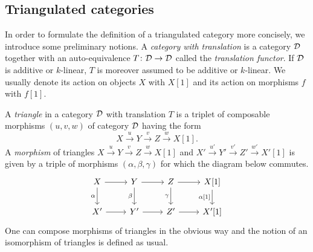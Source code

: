 \subsection{Triangulated categories}

In order to formulate the definition of a triangulated category more concisely, we introduce some preliminary notions. A \emph{category with translation} is a category $\mathcal D$ together with an auto-equivalence $T\colon \mathcal D \to \mathcal D$ called the \emph{translation functor}. If $\mathcal D$ is additive or $k$-linear, $T$ is moreover assumed to be additive or $k$-linear. We usually denote its action on objects $X$ with $X[1]$ and its action on morphisms $f$ with $f[1]$.

A \emph{triangle} in a category $\mathcal D$ with translation $T$ is a triplet of composable morphisms $(u, v, w)$ of category $\mathcal D$ having the form 
\[
    X\xrightarrow{u} Y \xrightarrow{v} Z \xrightarrow{w} X[1].
\]
A \emph{morphism} of triangles $X\xrightarrow{u} Y \xrightarrow{v} Z \xrightarrow{w} X[1]$ and $X'\xrightarrow{u'} Y' \xrightarrow{v'} Z' \xrightarrow{w'} X'[1]$ is given by a triple of morphisms $(\alpha, \beta, \gamma)$ for which the diagram below commutes.
\[\begin{tikzcd}
	X & Y & Z & {X[1]} \\
	{X'} & {Y'} & {Z'} & {X'[1]}
	\arrow[from=1-1, to=1-2]
	\arrow["\alpha"', from=1-1, to=2-1]
	\arrow[from=1-2, to=1-3]
	\arrow["\beta"', from=1-2, to=2-2]
	\arrow[from=1-3, to=1-4]
	\arrow["\gamma"', from=1-3, to=2-3]
	\arrow["{\alpha[1]}"', from=1-4, to=2-4]
	\arrow[from=2-1, to=2-2]
	\arrow[from=2-2, to=2-3]
	\arrow[from=2-3, to=2-4]
\end{tikzcd}
\]
One can compose morphisms of triangles in the obvious way and the notion of an isomorphism of triangles is defined as usual.

